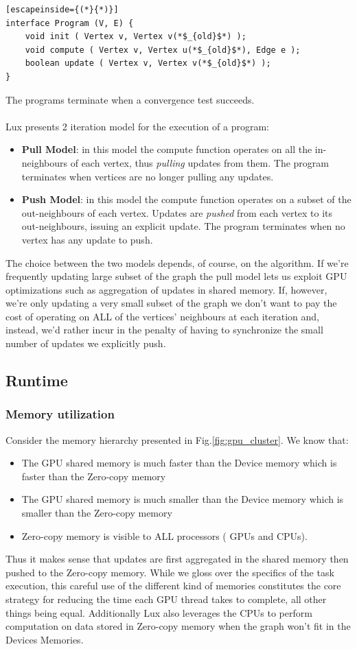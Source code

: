 \documentclass[]{article}
\begin{document}
\begin{lstlisting}[escapeinside={(*}{*)}]
interface Program (V, E) {
    void init ( Vertex v, Vertex v(*$_{old}$*) );
    void compute ( Vertex v, Vertex u(*$_{old}$*), Edge e );
    boolean update ( Vertex v, Vertex v(*$_{old}$*) );
}
\end{lstlisting}
The programs terminate when a convergence test succeeds.\\\\
Lux presents 2 iteration model for the execution of a program:
\begin{itemize}
	\item \textbf{Pull Model}: in this model the compute function operates on all the in-neighbours of each vertex, thus \textit{pulling} updates from them. The program terminates when vertices are no longer pulling any updates.
	\item \textbf{Push Model}: in this model the compute function operates on a subset of the out-neighbours of each vertex. Updates are \textit{pushed} from each vertex to its out-neighbours, issuing an explicit update. The program terminates when no vertex has any update to push.
\end{itemize}
The choice between the two models depends, of course, on the algorithm. If we're frequently updating large subset of the graph the pull model lets us exploit GPU optimizations such as aggregation of updates in shared memory. If, however, we're only updating a very small subset of the graph we don't want to pay the cost of operating on ALL of the vertices' neighbours at each iteration and, instead, we'd rather incur in the penalty of having to synchronize the small number of updates we explicitly push.

\subsection{Runtime}
\subsubsection{Memory utilization}
Consider the memory hierarchy presented in Fig.\ref{fig:gpu_cluster}. We know that:
\begin{itemize}
	\item The GPU shared memory is much faster than the Device memory which is faster than the Zero-copy memory
	\item The GPU shared memory is much smaller than the Device memory which is smaller than the Zero-copy memory
	\item Zero-copy memory is visible to ALL processors ( GPUs and CPUs).
\end{itemize}
Thus it makes sense that updates are first aggregated in the shared memory then pushed to the Zero-copy memory. While we gloss over the specifics of the task execution, this careful use of the different kind of memories constitutes the core strategy for reducing the time each GPU thread takes to complete, all other things being equal. Additionally Lux also leverages the CPUs to perform computation on data stored in Zero-copy memory when the graph won't fit in the Devices Memories.
\end{document}
